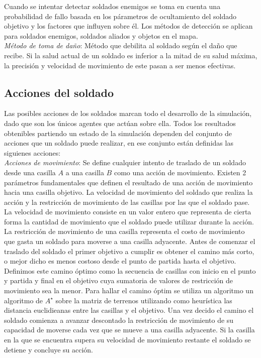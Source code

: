 \documentclass[twoside]{article}
\begin{document}
Cuando se intentar detectar soldados enemigos se toma en cuenta una probabilidad de fallo basada en los p\'arametros de ocultamiento del soldado objetivo y los factores que influyen sobre \'el.
Los m\'etodos de detecci\'on se aplican para soldados enemigos, soldados aliados y objetos en el mapa.\\

\emph{M\'etodo de toma de da\~no}: M\'etodo que debilita al soldado seg\'un el da\~no que recibe. Si la salud actual de un soldado es inferior a la mitad de su salud m\'axima, la precisi\'on y velocidad de movimiento de este pasan a ser menos efectivas.

\subsection{Acciones del soldado}

Las posibles acciones de los soldados marcan todo el desarrollo de la simulaci\'on, dado que son los \'unicos agentes que act\'uan sobre ella. Todos los resultados obtenibles partiendo un estado de la simulaci\'on dependen del conjunto de acciones que un soldado puede realizar, en ese conjunto est\'an definidas las siguienes acciones:\\

\emph{Acciones de movimiento}: Se define cualquier intento de traslado de un soldado desde una casilla $A$ a una casilla $B$ como una acci\'on de movimiento.
Existen 2 par\'ametros fundamentales que definen el resultado de una acci\'on de movimiento hacia una casilla objetivo. La velocidad de movimiento del soldado que realiza la acci\'on y la restricci\'on de movimiento de las casillas por las que el soldado pase.
La velocidad de movimiento consiste en un valor entero que representa de cierta forma la cantidad de movimiento que el soldado puede utilizar durante la acci\'on.
La restricci\'on de movimiento de una casilla representa el costo de movimiento que gasta un soldado para moverse a una casilla adyacente.
Antes de comenzar el traslado del soldado el primer objetivo a cumplir es obtener el camino m\'as corto, o mejor dicho es menos costoso desde el punto de partida hasta el objetivo. Definimos este camino \'optimo como la secuencia de casillas con inicio en el punto y partida y final en el objetivo cuya sumatoria de valores de restricci\'on de movimiento sea la menor. 
Para hallar el camino \'optim se utiliza un algoritmo un algoritmo de $A^\star$ sobre la matriz de terrenos utilizando como heur\'istica las distancia euclidieanas entre las casillas y el objetivo.
Una vez decido el camino el soldado comienza a avanzar descontado la restricci\'on de movimiento de su capacidad de moverse cada vez que se mueve a una casilla adyacente. Si la casilla en la que se encuentra supera su velocidad de movimiento restante el soldado se detiene y concluye su acci\'on.\\
\end{document}

